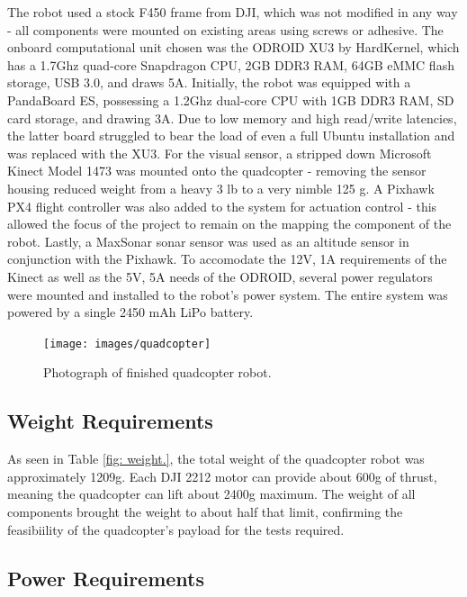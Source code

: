 \documentclass[letterpaper, oneside, 10pt]{report}
\begin{document}
The robot used a stock F450 frame from DJI, which was not modified in any way - all components were mounted on existing areas using screws or adhesive. The onboard computational unit chosen was the ODROID XU3 by HardKernel, which has a 1.7Ghz quad-core Snapdragon CPU, 2GB DDR3 RAM, 64GB eMMC flash storage, USB 3.0, and draws 5A. Initially, the robot was equipped with a PandaBoard ES, possessing a 1.2Ghz dual-core CPU with 1GB DDR3 RAM, SD card storage, and drawing 3A. Due to low memory and high read/write latencies, the latter board struggled to bear the load of even a full Ubuntu installation and was replaced with the XU3. For the visual sensor, a stripped down Microsoft Kinect Model 1473 was mounted onto the quadcopter - removing the sensor housing reduced weight from a heavy 3 lb to a very nimble 125 g. A Pixhawk PX4 flight controller was also added to the system for actuation control - this allowed the focus of the project to remain on the mapping the component of the robot. Lastly, a MaxSonar sonar sensor was used as an altitude sensor in conjunction with the Pixhawk. To accomodate the 12V, 1A requirements of the Kinect as well as the 5V, 5A needs of the ODROID, several power regulators were mounted and installed to the robot's power system. The entire system was powered by a single 2450 mAh LiPo battery.

\begin{figure}[h!]
 \caption{Photograph of finished quadcopter robot.}
 \centering
   \texttt{[image: images/quadcopter]}
\end{figure}

\subsection{Weight Requirements}

As seen in Table \ref{fig: weight.}, the total weight of the quadcopter robot was approximately 1209g. Each DJI 2212 motor can provide about 600g of thrust, meaning the quadcopter can lift about 2400g maximum. The weight of all components brought the weight to about half that limit, confirming the feasibiility of the quadcopter's payload for the tests required.

\subsection{Power Requirements}
\end{document}
